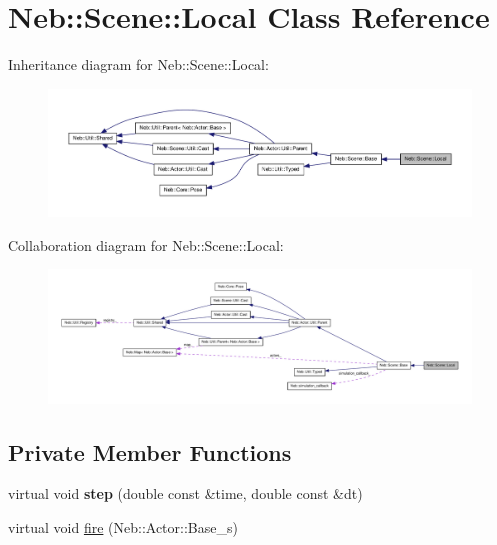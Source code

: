 \hypertarget{classNeb_1_1Scene_1_1Local}{\section{\-Neb\-:\-:\-Scene\-:\-:\-Local \-Class \-Reference}
\label{classNeb_1_1Scene_1_1Local}
}


\-Inheritance diagram for \-Neb\-:\-:\-Scene\-:\-:\-Local\-:\nopagebreak
\begin{figure}[H]
\begin{center}
\leavevmode
\includegraphics[width=350pt]{classNeb_1_1Scene_1_1Local__inherit__graph}
\end{center}
\end{figure}


\-Collaboration diagram for \-Neb\-:\-:\-Scene\-:\-:\-Local\-:\nopagebreak
\begin{figure}[H]
\begin{center}
\leavevmode
\includegraphics[width=350pt]{classNeb_1_1Scene_1_1Local__coll__graph}
\end{center}
\end{figure}
\subsection*{\-Private \-Member \-Functions}
\begin{DoxyCompactItemize}
\item 
\hypertarget{classNeb_1_1Scene_1_1Local_a88b15bcc2bcad2efc52095c115b5d8d1}{virtual void {\bfseries step} (double const \&time, double const \&dt)}\label{classNeb_1_1Scene_1_1Local_a88b15bcc2bcad2efc52095c115b5d8d1}

\item 
virtual void \hyperlink{classNeb_1_1Scene_1_1Local_a67806ea48d401a114f78de30c14e6eca}{fire} (\-Neb\-::\-Actor\-::\-Base\-\_\-s)
\end{DoxyCompactItemize}


